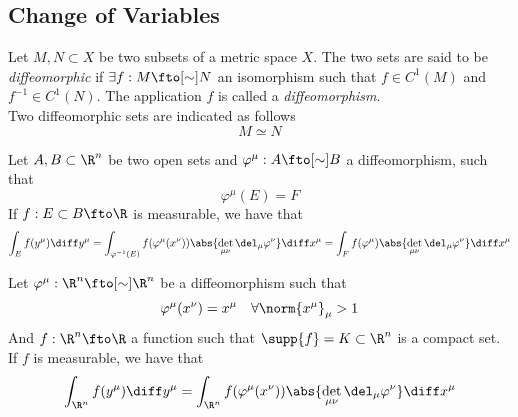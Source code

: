 \documentclass[../mmf.tex]{subfiles}
\begin{document}
\subsection{Change of Variables}
\begin{dfn}[Diffeomorphism]
	Let $M,N\subset X$ be two subsets of a metric space $X$. The two sets are said to be \textit{diffeomorphic} if $\exists f:M\fto[\sim]N$ an isomorphism such that $f\in C^1(M)$ and $f^{-1}\in C^1(N)$. The application $f$ is called a \textit{diffeomorphism}.\\
	Two diffeomorphic sets are indicated as follows
	\begin{equation*}
		M\simeq N
	\end{equation*}
\end{dfn}
\begin{thm}
	Let $A,B\subset\R^n$ be two open sets and $\varphi^\mu:A\fto[\sim]B$ a diffeomorphism, such that
	\begin{equation*}
		\varphi^\mu(E)=F
	\end{equation*}
	If $f:E\subset B\fto\R$ is measurable, we have that
	\begin{equation*}
		\int_{E}^{}f(y^\mu)\diff y^\mu=\int_{\varphi^{-1}(E)}^{}f(\varphi^\mu(x^\nu))\abs{\det_{\mu\nu}\del_\mu\varphi^\nu}\diff x^\mu=\int_{F}^{}f(\varphi^\mu)\abs{\det_{\mu\nu}\del_\mu\varphi^\nu}\diff x^\mu
	\end{equation*}
\end{thm}
\begin{thm}
	Let $\varphi^\mu:\R^n\fto[\sim]\R^n$ be a diffeomorphism such that
	\begin{equation*}
		\varphi^\mu(x^\nu)=x^\mu\quad\forall\norm{x^\mu}_\mu>1
	\end{equation*}
	And $f:\R^n\fto\R$ a function such that $\supp{f}=K\subset\R^n$ is a compact set. If $f$ is measurable, we have that
	\begin{equation}
		\int_{\R^n}^{}f(y^\mu)\diff y^\mu=\int_{\R^n}^{}f(\varphi^\mu(x^\nu))\abs{\det_{\mu\nu}\del_\mu\varphi^\nu}\diff x^\mu
		\label{eq:changevar}
	\end{equation}
\end{thm}
\end{document}
